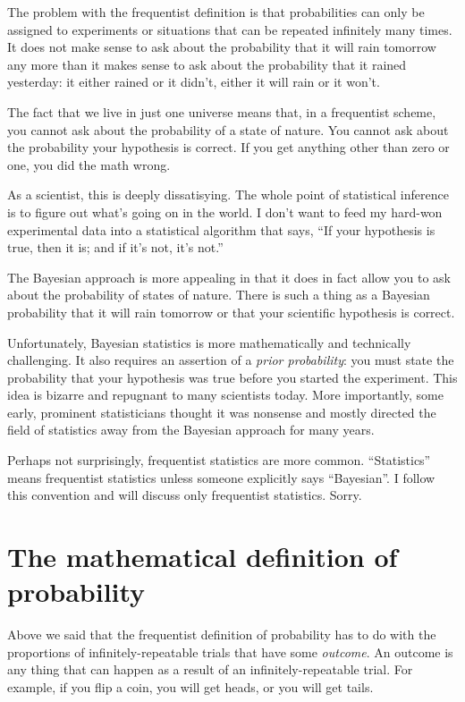 The problem with the frequentist definition is that probabilities can only
be assigned to experiments or situations that can be repeated infinitely many
times. It does not make sense to ask about the probability that it will rain
tomorrow any more than it makes sense to ask about the probability that it
rained yesterday: it either rained or it didn't, either it will rain or it
won't.

The fact that we live in just one universe means that, in a frequentist scheme,
you cannot ask about the probability of a state of nature. You cannot ask about
the probability your hypothesis is correct. If you get anything other than zero
or one, you did the math wrong.

As a scientist, this is deeply dissatisying.  The whole point of statistical
inference is to figure out what's going on in the world. I don't want to feed
my hard-won experimental data into a statistical algorithm that says, ``If your
hypothesis is true, then it is; and if it's not, it's not.''

The Bayesian approach is more appealing in that it does in fact allow you to
ask about the probability of states of nature. There is such a thing as a
Bayesian probability that it will rain tomorrow or that your scientific
hypothesis is correct.

Unfortunately, Bayesian statistics is more mathematically and technically
challenging. It also requires an assertion of a \emph{prior probability}: you
must state the probability that your hypothesis was true before you started the
experiment. This idea is bizarre and repugnant to many scientists today. More
importantly, some early, prominent statisticians thought it was nonsense and
mostly directed the field of statistics away from the Bayesian approach for
many years.

Perhaps not surprisingly, frequentist statistics are more common.
``Statistics'' means frequentist statistics unless someone explicitly says
``Bayesian''. I follow this convention and will discuss only frequentist
statistics. Sorry.


\section{The mathematical definition of probability}


Above we said that the frequentist definition of probability has to do with the
proportions of infinitely-repeatable trials that have some \emph{outcome}. An
outcome is any thing that can happen as a result of an infinitely-repeatable
trial. For example, if you flip a coin, you will get heads, or you will get
tails.

